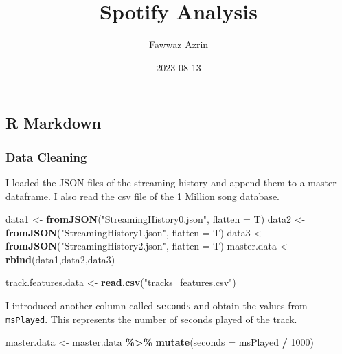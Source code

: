 \documentclass[
]{article}
\title{Spotify Analysis}
\author{Fawwaz Azrin}
\date{2023-08-13}
\newenvironment{Shaded}{\begin{snugshade}}{\end{snugshade}}
\newcommand{\AttributeTok}[1]{\textcolor[rgb]{0.13,0.29,0.53}{#1}}
\newcommand{\DecValTok}[1]{\textcolor[rgb]{0.00,0.00,0.81}{#1}}
\newcommand{\FunctionTok}[1]{\textcolor[rgb]{0.13,0.29,0.53}{\textbf{#1}}}
\newcommand{\NormalTok}[1]{#1}
\newcommand{\OtherTok}[1]{\textcolor[rgb]{0.56,0.35,0.01}{#1}}
\newcommand{\SpecialCharTok}[1]{\textcolor[rgb]{0.81,0.36,0.00}{\textbf{#1}}}
\newcommand{\StringTok}[1]{\textcolor[rgb]{0.31,0.60,0.02}{#1}}
\begin{document}
\maketitle

\hypertarget{r-markdown}{%
\subsection{R Markdown}\label{r-markdown}}

\hypertarget{data-cleaning}{%
\subsubsection{Data Cleaning}\label{data-cleaning}}

I loaded the JSON files of the streaming history and append them to a
master dataframe. I also read the csv file of the 1 Million song
database.

\begin{Shaded}
\begin{Highlighting}[]
\NormalTok{data1 }\OtherTok{\textless{}{-}} \FunctionTok{fromJSON}\NormalTok{(}\StringTok{"StreamingHistory0.json"}\NormalTok{, }\AttributeTok{flatten =}\NormalTok{ T)}
\NormalTok{data2 }\OtherTok{\textless{}{-}} \FunctionTok{fromJSON}\NormalTok{(}\StringTok{"StreamingHistory1.json"}\NormalTok{, }\AttributeTok{flatten =}\NormalTok{ T)}
\NormalTok{data3 }\OtherTok{\textless{}{-}} \FunctionTok{fromJSON}\NormalTok{(}\StringTok{"StreamingHistory2.json"}\NormalTok{, }\AttributeTok{flatten =}\NormalTok{ T)}
\NormalTok{master.data }\OtherTok{\textless{}{-}} \FunctionTok{rbind}\NormalTok{(data1,data2,data3)}

\NormalTok{track.features.data }\OtherTok{\textless{}{-}} \FunctionTok{read.csv}\NormalTok{(}\StringTok{"tracks\_features.csv"}\NormalTok{)}
\end{Highlighting}
\end{Shaded}

I introduced another column called \texttt{seconds} and obtain the
values from \texttt{msPlayed}. This represents the number of seconds
played of the track.

\begin{Shaded}
\begin{Highlighting}[]
\NormalTok{master.data }\OtherTok{\textless{}{-}}\NormalTok{ master.data }\SpecialCharTok{\%\textgreater{}\%}
  \FunctionTok{mutate}\NormalTok{(}\AttributeTok{seconds =}\NormalTok{ msPlayed }\SpecialCharTok{/} \DecValTok{1000}\NormalTok{)}
\end{Highlighting}
\end{Shaded}
\end{document}
